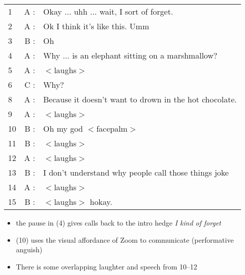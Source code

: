 \documentclass[a4]{scrartcl}
\begin{document}
\begin{center}
\begin{tcolorbox}[title=Joke 4.1A -- Group 1 Zoom]
\begin{tabularx}{0.8\textwidth}{lrX}
  1 & A : & Okay ... uhh ... wait, I sort of forget. \\
  2 & A : & Ok I think it's like this. Umm\\
  3 & B : & Oh\\
  4 & A : & Why ... is an elephant sitting on a marshmallow?\\
  5 & A : & $<$laughs$>$\\
  6 & C : & Why?\\
  8 & A : & Because it doesn't want to drown in the hot chocolate.\\
  9 & A : & $<$laughs$>$\\
 10 & B : & Oh my god $<$facepalm$>$\\
 11 & B : & $<$laughs$>$\\
 12 & A : & $<$laughs$>$\\
 13 & B : & I don't understand why people call those things joke\\
 14 & A : & $<$laughs$>$\\
 15 & B : & $<$laughs$>$ hokay.\\
\end{tabularx}
\end{tcolorbox}
\end{center}

\begin{itemize}
  \item the pause in (4) gives calls back to the intro hedge \textit{I kind of forget}
  \item (10) uses the visual affordance of Zoom to communicate  (performative anguish)
  \item There is some overlapping laughter and speech from 10--12
\end{itemize}
\end{document}
